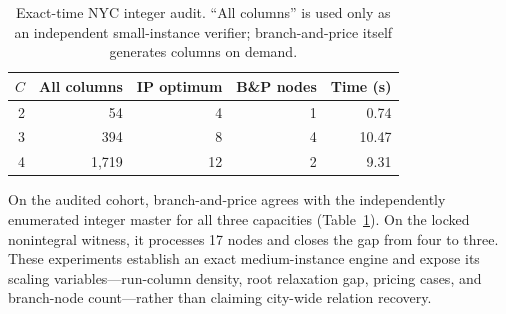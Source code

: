 \begin{table}[t]
\centering
\caption{Exact-time NYC integer audit.  ``All columns'' is used only as an
independent small-instance verifier; branch-and-price itself generates columns
on demand.}
\label{tab:bp}
\small
\begin{tabular}{@{}rrrrr@{}}
\toprule
$C$ & All columns & IP optimum & B\&P nodes & Time (s) \\
\midrule
2 & 54    & 4  & 1 & 0.74 \\
3 & 394   & 8  & 4 & 10.47 \\
4 & 1,719 & 12 & 2 & 9.31 \\
\bottomrule
\end{tabular}
\end{table}

On the audited cohort, branch-and-price agrees with the independently enumerated
integer master for all three capacities (Table~\ref{tab:bp}).  On the locked
nonintegral witness, it processes 17 nodes and closes the gap from four to
three.  These experiments establish an exact medium-instance engine and expose
its scaling variables---run-column density, root relaxation gap, pricing cases,
and branch-node count---rather than claiming city-wide relation recovery.
